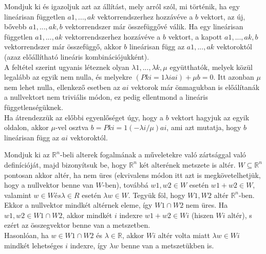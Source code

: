 \begin{frame}
  \begin{tcolorbox}[title={3. (4p)}]
      Mondjuk ki és igazoljuk azt az állítást, mely arról szól, mi történik, ha egy lineárisan független $a1,...,ak$ vektorrendszerhez hozzávéve a $b$ vektort, az új, bővebb $a1,...,ak,b$ vektorrendszer már összefüggővé válik.
  \tcblower
    Ha egy lineárisan független $a1,...,ak$ vektorrendszerhez hozzávéve a $b$ vektort, a kapott $a1,...,ak,b$ vektorrendszer már összefüggő, akkor $b$ lineárisan függ az $a1,...,ak$ vektoroktól (azaz előállítható lineáris kombinációjukként).\\
    
    A feltétel szerint ugyanis léteznek olyan ${\lambda}1,...,{\lambda}k,{\mu}$ együtthatók, melyek közül legalább az egyik nem nulla, és melyekre $(Pk i=1 {\lambda}iai) + {\mu}b = 0$. Itt azonban ${\mu}$ nem lehet nulla, ellenkező esetben az $ai$ vektorok már önmagukban is előálítanák a nullvektort nem triviális módon, ez pedig ellentmond a lineáris függetlenségüknek.\\
    
    Ha átrendezzük az előbbi egyenlőséget úgy, hogy a $b$ vektort hagyjuk az egyik oldalon, akkor ${\mu}$-vel osztva $b = Pk i=1(−{\lambda}i/{\mu})ai$, ami azt mutatja, hogy $b$ lineárisan függ az $ai$ vektoroktól.
  \end{tcolorbox}
\end{frame}

\begin{frame}
  \begin{tcolorbox}[title={4. (4p)}]
      Mondjuk ki az $\mathbb{R}^n$-beli alterek fogalmának a műveletekre való zártsággal való deﬁnícióját, majd bizonyítsuk be, hogy $\mathbb{R}^n$ két alterének metszete is altér.
  \tcblower
    $W {\subseteq} \mathbb{R}^n$ pontosan akkor altér, ha nem üres (ekvivalens módon itt azt is megkövetelhetjük, hogy a nullvektor benne van $W$-ben), továbbá $w1,w2 \in W$ esetén $w1 +w2 \in W$, valamint $w \in W és {\lambda} \in R$ esetén ${\lambda}w \in W$. Tegyük föl, hogy $W1,W2$ altér $\mathbb{R}^n$-ben.\\
    
    Ekkor a nullvektor mindkét altérnek eleme, így $W1 {\cap}W2$ nem üres. Ha $w1,w2 \in W1 {\cap}W2$, akkor mindkét $i$ indexre $w1 +w2 \in Wi$ (hiszen $Wi$ altér), s ezért az összegvektor benne van a metszetben.\\
    
    Hasonlóan, ha $w \in W1 {\cap} W2$ és ${\lambda} \in \mathbb{R}$, akkor $Wi$ altér volta miatt ${\lambda}w \in Wi$ mindkét lehetséges $i$ indexre, így ${\lambda}w$ benne van a metszetükben is.
  \end{tcolorbox}
\end{frame}


